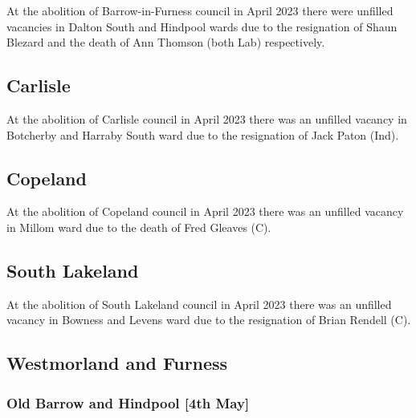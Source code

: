 \documentclass[a4paper,openany]{book}
\begin{document}
\begin{resultsiii}
At the abolition of Barrow-in-Furness council in April 2023 there were unfilled vacancies in Dalton South and Hindpool wards due to the resignation of Shaun Blezard and the death of Ann Thomson (both Lab) respectively.%
%

\subsection*{Carlisle}

At the abolition of Carlisle council in April 2023 there was an unfilled vacancy in Botcherby and Harraby South ward due to the resignation of Jack Paton (Ind).%

\subsection*{Copeland}

At the abolition of Copeland council in April 2023 there was an unfilled vacancy in Millom ward due to the death of Fred Gleaves (C).%

\subsection*{South Lakeland}

At the abolition of South Lakeland council in April 2023 there was an unfilled vacancy in Bowness and Levens ward due to the resignation of Brian Rendell (C).%

\subsection*{Westmorland and Furness}

\subsubsection*{Old Barrow and Hindpool \hspace*{\fill}\nolinebreak[1]%
	\enspace\hspace*{\fill}
	[4th May]}



\end{resultsiii}
\end{document}

